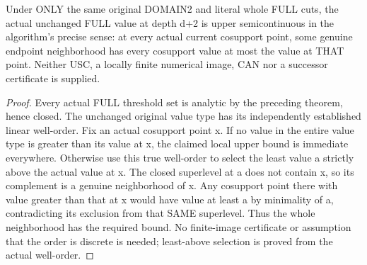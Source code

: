 \begin{theorem}
\label{hir:original-full-cut-all-depth-usc}
\leanok
Under ONLY the same original DOMAIN2 and literal whole FULL cuts, the actual
unchanged FULL value at depth d+2 is upper semicontinuous in the algorithm's
precise sense: at every actual current cosupport point, some genuine endpoint
neighborhood has every cosupport value at most the value at THAT point.
Neither USC, a locally finite numerical image, CAN nor a successor certificate
is supplied.
\end{theorem}
\begin{proof}
Every actual FULL threshold set is analytic by the preceding theorem, hence
closed. The unchanged original value type has its independently established
linear well-order. Fix an actual cosupport point x. If no value in the entire
value type is greater than its value at x, the claimed local upper bound is
immediate everywhere. Otherwise use this true well-order to select the least
value a strictly above the actual value at x. The closed superlevel at a does
not contain x, so its complement is a genuine neighborhood of x. Any cosupport
point there with value greater than that at x would have value at least a by
minimality of a, contradicting its exclusion from that SAME superlevel. Thus
the whole neighborhood has the required bound. No finite-image certificate or
assumption that the order is discrete is needed; least-above selection is
proved from the actual well-order.
\end{proof}

